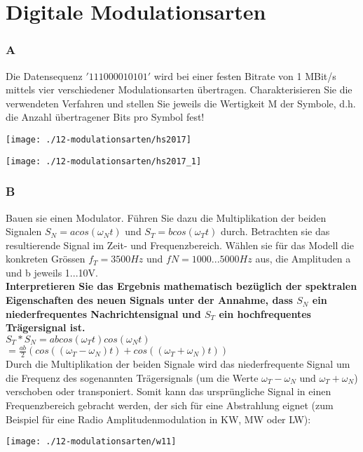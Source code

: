

\section{Digitale Modulationsarten}

\subsubsection{A}
Die Datensequenz $'1 1 1 0 0 0 0 1 0 1 0 1'$ wird bei einer festen Bitrate von 1 MBit/s mittels vier verschiedener Modulationsarten übertragen. Charakterisieren Sie die verwendeten Verfahren und stellen Sie jeweils die Wertigkeit M der Symbole, d.h. die Anzahl übertragener
Bits pro Symbol fest!
\begin{center}
    \vspace{-8pt}
    \texttt{[image: ./12-modulationsarten/hs2017]}
    \vspace{-8pt}
\end{center}
\begin{center}
    \vspace{-8pt}
    \texttt{[image: ./12-modulationsarten/hs2017\_1]}
    \vspace{-8pt}
\end{center}

\subsubsection{B}
Bauen sie einen Modulator. Führen Sie dazu die Multiplikation der beiden Signalen $S_N = acos(\omega_Nt)$ und $S_T = bcos(\omega_Tt)$ durch. Betrachten sie das resultierende Signal im Zeit- und Frequenzbereich. Wählen sie für das Modell  die konkreten Grössen $f_T = 3500Hz$ und $fN = 1000...5000Hz$ aus, die Amplituden a und b jeweils 1...10V.\\

\textbf{Interpretieren Sie das Ergebnis mathematisch bezüglich der spektralen Eigenschaften des neuen Signals unter der Annahme, dass $S_N$ ein niederfrequentes Nachrichtensignal und $S_T$ ein hochfrequentes Trägersignal ist.}\\
$S_T*S_N=abcos(\omega_Tt)cos(\omega_Nt)$\\
$=\frac{ab}{2}(cos((\omega_T-\omega_N)t)+cos((\omega_T+\omega_N)t))$\\
Durch die Multiplikation der beiden Signale wird das niederfrequente Signal um die Frequenz des sogenannten Trägersignals (um die Werte $\omega_T -\omega_N$ und $\omega_T+\omega_N$) verschoben oder transponiert. Somit kann das ursprüngliche Signal in einen Frequenzbereich gebracht werden, der sich für eine Abstrahlung eignet (zum Beispiel für eine Radio Amplitudenmodulation in KW, MW oder LW):
\begin{center}
    \vspace{-8pt}
    \texttt{[image: ./12-modulationsarten/w11]}
    \vspace{-8pt}
\end{center}

